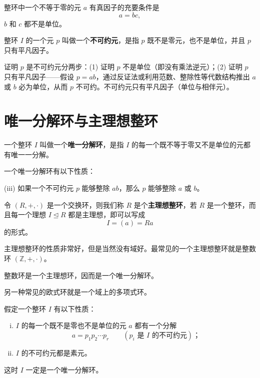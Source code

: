 \begin{theorem}[真因子判别（定理 3）]
整环中一个不等于零的元 $a$ 有真因子的充要条件是
\[
a=bc,
\]
$b$ 和 $c$ 都不是单位。
\end{theorem}

\begin{definition}[不可约元]
整环 $I$ 的一个元 $p$ 叫做一个\textbf{不可约元}，是指 $p$ 既不是零元，也不是单位，并且 $p$ 只有平凡因子。
\end{definition}

\begin{note}[不可约元的证明思路]
证明 $p$ 是不可约元分两步：(1) 证明 $p$ 不是单位（即没有乘法逆元）；(2) 证明 $p$ 只有平凡因子——假设 $p=ab$，通过反证法或利用范数、整除性等代数结构推出 $a$ 或 $b$ 必为单位，从而 $p$ 不可约。不可约元只有平凡因子（单位与相伴元）。
\end{note}

\section{唯一分解环与主理想整环}

\begin{definition}[唯一分解环]
一个整环 $I$ 叫做一个\textbf{唯一分解环}，是指 $I$ 的每一个既不等于零又不是单位的元都有唯一一分解。
\end{definition}

\begin{theorem}[定理 1：唯一分解环的性质]
一个唯一分解环有以下性质：

(iii) 如果一个不可约元 $p$ 能够整除 $ab$，那么 $p$ 能够整除 $a$ 或 $b$。
\end{theorem}

\begin{definition}[定义 2.25：主理想整环]
令 $(R,+,\cdot)$ 是一个交换环，则我们称 $R$ 是个\textbf{主理想整环}，若 $R$ 是一个整环，而且每一个理想 $I\trianglelefteq R$ 都是主理想，即可以写成
\[
I=(a)=Ra
\]
的形式。

主理想整环的性质非常好，但是当然没有域好。最常见的一个主理想整环就是整数环 $(\mathbb{Z},+,\cdot)$。
\end{definition}

\begin{theorem}[定理 2：整数环是主理想环]
整数环是一个主理想环，因而是一个唯一分解环。

另一种常见的欧式环就是一个域上的多项式环。
\end{theorem}

\begin{theorem}[定理 2：整环成为唯一分解环的条件]
假定一个整环 $I$ 有以下性质：
\begin{enumerate}[(i)]
  \item $I$ 的每一个既不是零也不是单位的元 $a$ 都有一个分解
  \[
    a=p_1p_2\cdots p_r\qquad(p_i\text{ 是 }I\text{ 的不可约元})；
  \]
  \item[(iii)] $I$ 的不可约元都是素元。
\end{enumerate}
这时 $I$ 一定是一个唯一分解环。
\end{theorem}


